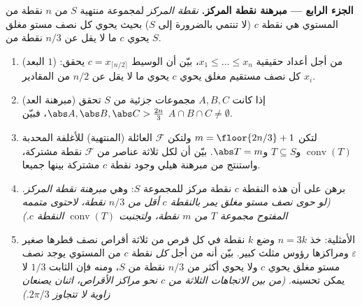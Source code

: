 \begin{problem}
\medskip
\noindent\textbf{الجزء الرابع --- مبرهنة نقطة المركز.}
\emph{نقطة المركز} لمجموعة منتهية $S$ من $n$ نقطة من المستوي
هي نقطة $c$ (لا تنتمي بالضرورة إلى $S$) بحيث يحوي كل نصف
مستو مغلق يحوي $c$ ما لا يقل عن $n/3$ نقطة من $S$.
\begin{enumerate}[resume]
  \item (البعد $1$) من أجل أعداد حقيقية $x_1 \leq \dots \leq x_n$، بيّن أن الوسيط
        $c = x_{\lceil n/2 \rceil}$ يحقق: كل نصف مستقيم مغلق يحوي $c$ يحوي ما لا يقل
        عن $n/2$ من المقادير $x_i$.
  \item (مبرهنة العد) إذا كانت $A, B, C$ مجموعات جزئية من $S$ تحقق
        $\abs A, \abs B, \abs C > \tfrac{2n}3$، فبيّن $A \cap
        B \cap C \neq \emptyset$.
  \item لتكن $m = \floor{2n/3} + 1$ ولتكن $\mathcal F$ العائلة (المنتهية) للأغلفة المحدبة
        $\operatorname{conv}(T)$ و$T \subseteq S$ و$\abs T =
        m$. بيّن أن لكل ثلاثة عناصر من $\mathcal F$
        نقطة مشتركة، واستنتج من مبرهنة هيلي وجود نقطة $c$ مشتركة
        بينها جميعا.
  \item برهن على أن هذه النقطة $c$ نقطة مركز للمجموعة $S$:
        وهي \emph{مبرهنة نقطة المركز}. \emph{(لو حوى نصف مستو مغلق
        يمر بالنقطة $c$ أقل من $n/3$ نقطة، لاحتوى متممه المفتوح
        مجموعة $T$ من $m$ نقطة، ولتجنبت $\operatorname{conv}(T)$ النقطة
        $c$.)}
  \item الأمثلية: خذ $n = 3k$ وضع $k$ نقطة في كل قرص من ثلاثة
        أقراص نصف قطرها صغير $\varepsilon$ ومراكزها رؤوس مثلث كبير. بيّن
        أنه من أجل \emph{كل} نقطة $c$ من المستوي يوجد نصف مستو
        مغلق يحوي $c$ ولا يحوي أكثر من $n/3$ نقطة من $S$،
        ومنه فإن الثابت $1/3$ لا يمكن تحسينه. \emph{(من بين
        الاتجاهات الثلاثة من $c$ نحو مراكز الأقراص، اثنان يصنعان
        زاوية لا تتجاوز $2\pi/3$.)}
\end{enumerate}


\end{problem}

